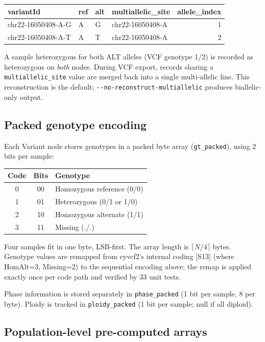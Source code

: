 \documentclass[11pt,a4paper]{article}
\begin{document}
\begin{tabular}{llllr}
\toprule
variantId & ref & alt & multiallelic\_site & allele\_index \\
\midrule
chr22-16050408-A-G & A & G & chr22-16050408-A & 1 \\
chr22-16050408-A-T & A & T & chr22-16050408-A & 2 \\
\bottomrule
\end{tabular}

\vspace{6pt}
A sample heterozygous for both ALT alleles (VCF genotype 1/2) is recorded as heterozygous on \textit{both} nodes. During VCF export, records sharing a \texttt{multiallelic\_site} value are merged back into a single multi-allelic line. This reconstruction is the default; \texttt{-{}-no-reconstruct-multiallelic} produces biallelic-only output.

\subsection*{Packed genotype encoding}

Each Variant node stores genotypes in a packed byte array (\texttt{gt\_packed}), using 2 bits per sample:

\begin{tabular}{ccl}
\toprule
Code & Bits & Genotype \\
\midrule
0 & 00 & Homozygous reference (0/0) \\
1 & 01 & Heterozygous (0/1 or 1/0) \\
2 & 10 & Homozygous alternate (1/1) \\
3 & 11 & Missing (./.) \\
\bottomrule
\end{tabular}

\vspace{6pt}
Four samples fit in one byte, LSB-first. The array length is $\lceil N/4 \rceil$ bytes. Genotype values are remapped from cyvcf2's internal coding [S13] (where HomAlt=3, Missing=2) to the sequential encoding above; the remap is applied exactly once per code path and verified by 33 unit tests.

Phase information is stored separately in \texttt{phase\_packed} (1 bit per sample, 8 per byte). Ploidy is tracked in \texttt{ploidy\_packed} (1 bit per sample; null if all diploid).

\subsection*{Population-level pre-computed arrays}
\end{document}
